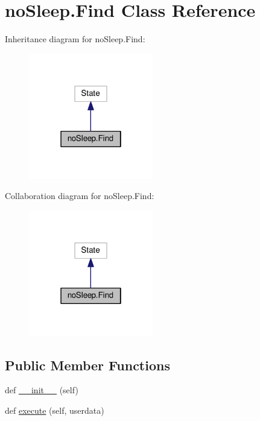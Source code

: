 \hypertarget{classnoSleep_1_1Find}{}\section{no\+Sleep.\+Find Class Reference}
\label{classnoSleep_1_1Find}


Inheritance diagram for no\+Sleep.\+Find\+:\nopagebreak
\begin{figure}[H]
\begin{center}
\leavevmode
\includegraphics[width=154pt]{classnoSleep_1_1Find__inherit__graph}
\end{center}
\end{figure}


Collaboration diagram for no\+Sleep.\+Find\+:\nopagebreak
\begin{figure}[H]
\begin{center}
\leavevmode
\includegraphics[width=154pt]{classnoSleep_1_1Find__coll__graph}
\end{center}
\end{figure}
\subsection*{Public Member Functions}
\begin{DoxyCompactItemize}
\item 
def \hyperlink{classnoSleep_1_1Find_aff34d2da153e2a1aff424ec9a02dcdb2}{\+\_\+\+\_\+init\+\_\+\+\_\+} (self)
\item 
def \hyperlink{classnoSleep_1_1Find_a3a023c41893fa105656edec93c0891cf}{execute} (self, userdata)
\end{DoxyCompactItemize}
